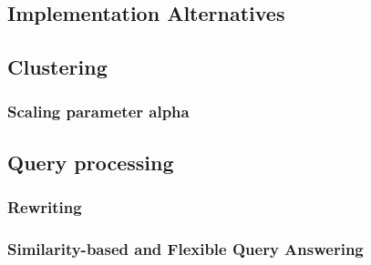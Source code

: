 \subsection{Implementation Alternatives}
\label{sec:impl_alter}

\subsection{Clustering}
\label{sec:impl_clust}

\subsubsection{Scaling parameter alpha}

\subsection{Query processing}
\label{sec:impl_qpro}

\subsubsection{Rewriting}

\subsubsection{Similarity-based and Flexible Query Answering}